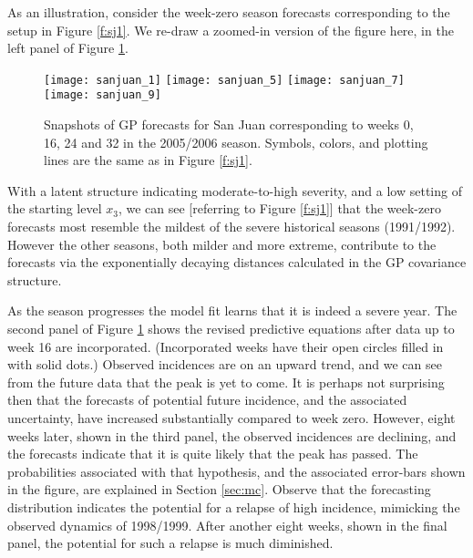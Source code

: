 \documentclass[12pt]{article}
\begin{document}
As an illustration,  consider the week-zero season forecasts corresponding to
the setup in Figure \ref{f:sj1}. We re-draw a zoomed-in version of the figure
here, in the left panel of Figure
\ref{f:sjzoom}.
\begin{figure}[ht!]
\centering
\texttt{[image: sanjuan\_1]}
\texttt{[image: sanjuan\_5]}
\texttt{[image: sanjuan\_7]}
\texttt{[image: sanjuan\_9]}
\caption{Snapshots of GP forecasts for San Juan 
corresponding to weeks 0, 16, 24 and 32 in the 2005/2006 season. Symbols,
colors, and plotting lines are the same as in Figure \ref{f:sj1}. }
\label{f:sjzoom}
\end{figure}
With a latent structure indicating moderate-to-high severity, and a low
setting of the starting level $x_3$, we can see [referring
to Figure \ref{f:sj1}] that the week-zero forecasts most resemble the mildest of the
severe historical seasons (1991/1992).  However the other seasons, both
milder and more extreme, contribute to the forecasts via the exponentially
decaying distances calculated in the GP covariance structure.  

As the season progresses the model fit learns that it is indeed a severe year.
The second panel of Figure \ref{f:sjzoom} shows the revised predictive equations after
data up to week 16 are incorporated. (Incorporated weeks have their open
circles filled in with solid dots.)  Observed incidences are on an upward
trend, and we can see from the future data that the peak is yet to come.  It
is perhaps not surprising then that the forecasts of potential future
incidence, and the associated uncertainty, have increased substantially
compared to week zero.  However, eight weeks later, shown in the third panel,
the observed incidences are declining, and the forecasts indicate that it is
quite likely that the peak has passed.  The probabilities associated with that
hypothesis, and the associated error-bars shown in the figure, are explained
in Section \ref{sec:mc}.  Observe that the forecasting distribution indicates
the potential for a relapse of high incidence, mimicking the observed dynamics
of 1998/1999.  After another eight weeks, shown in the final panel, the
potential for such a relapse is much diminished.
\end{document}
